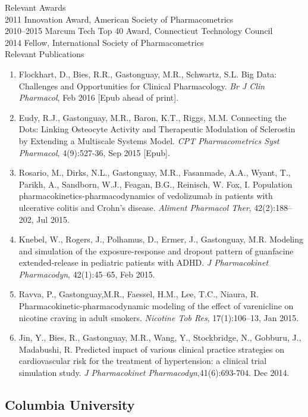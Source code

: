 \noindent
{\sc Relevant Awards} 
\\[2pt]
2011 Innovation Award, American Society of Pharmacometrics
\\
2010--2015 Marcum Tech Top 40 Award, Connecticut Technology Council
\\
2014 Fellow, International Society of Pharmacometrics
\\

\noindent
{\sc Relevant Publications}
\vspace*{-3pt}
\begin{enumerate}
\item Flockhart, D., Bies, R.R., Gastonguay, M.R., Schwartz, S.L. Big
  Data: Challenges and Opportunities for Clinical Pharmacology.  {\it
    Br J Clin Pharmacol}, Feb 2016 [Epub ahead of print].
\item Eudy, R.J., Gastonguay, M.R., Baron, K.T., Riggs,
  M.M. Connecting the Dots: Linking Osteocyte Activity and Therapeutic
  Modulation of Sclerostin by Extending a Multiscale Systems
  Model. {\it CPT Pharmacometrics Syst Pharmacol}, 4(9):527-36, Sep
  2015 [Epub].
\item Rosario, M., Dirks, N.L., Gastonguay, M.R., Fasanmade, A.A.,
  Wyant, T., Parikh, A., Sandborn, W.J., Feagan, B.G., Reinisch,
  W. Fox, I. Population pharmacokinetics-pharmacodynamics of
  vedolizumab in patients with ulcerative colitis and Crohn's
  disease. {\it Aliment Pharmacol Ther}, 42(2):188--202, Jul 2015.
\item Knebel, W., Rogers, J., Polhamus, D., Ermer, J., Gastonguay,
  M.R. Modeling and simulation of the exposure-response and dropout
  pattern of guanfacine extended-release in pediatric patients with
  ADHD. {\it J Pharmacokinet Pharmacodyn}, 42(1):45--65, Feb 2015.
\item Ravva, P., Gastonguay,M.R., Faessel, H.M., Lee, T.C., Niaura,
  R. Pharmacokinetic-pharmacodynamic modeling of the effect of
  varenicline on nicotine craving in adult smokers. {\it Nicotine Tob
    Res}, 17(1):106--13, Jan 2015.
\item Jin, Y., Bies, R., Gastonguay, M.R., Wang, Y., Stockbridge, N.,
  Gobburu, J., Madabushi, R. Predicted impact of various clinical
  practice strategies on cardiovascular risk for the treatment of
  hypertension: a clinical trial simulation study. {\it J
    Pharmacokinet Pharmacodyn},41(6):693-704. Dec 2014.
\end{enumerate}

\subsection{Columbia University}

